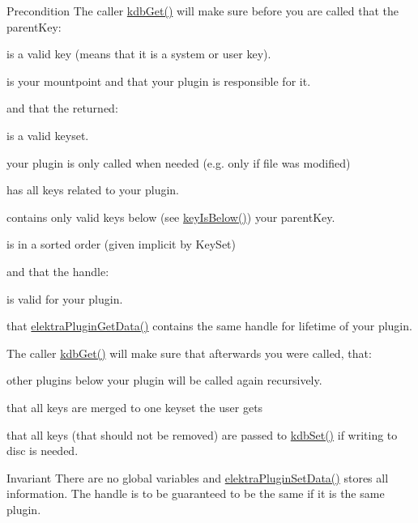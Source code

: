 \begin{DoxyPrecond}{Precondition}
The caller \hyperlink{group__kdb_ga28e385fd9cb7ccfe0b2f1ed2f62453a1}{kdb\+Get()} will make sure before you are called that the parent\+Key\+:
\begin{DoxyItemize}
\item is a valid key (means that it is a system or user key).
\item is your mountpoint and that your plugin is responsible for it. 
\end{DoxyItemize}

and that the returned\+:
\begin{DoxyItemize}
\item is a valid keyset.
\item your plugin is only called when needed (e.\+g. only if file was modified)
\item has {\ttfamily all} keys related to your plugin.
\item contains only valid keys below (see \hyperlink{group__keytest_ga03332b5d97c76a4fd2640aca4762b8df}{key\+Is\+Below()}) your parent\+Key.
\item is in a sorted order (given implicit by Key\+Set) 
\end{DoxyItemize}

and that the handle\+:
\begin{DoxyItemize}
\item is valid for your plugin.
\item that \hyperlink{group__plugin_gaafcf3216b46292f222b8cc7828b4dd20}{elektra\+Plugin\+Get\+Data()} contains the same handle for lifetime of your plugin.
\end{DoxyItemize}

The caller \hyperlink{group__kdb_ga28e385fd9cb7ccfe0b2f1ed2f62453a1}{kdb\+Get()} will make sure that afterwards you were called, that\+:
\begin{DoxyItemize}
\item other plugins below your plugin will be called again recursively.
\item that all keys are merged to one keyset the user gets
\item that all keys (that should not be removed) are passed to \hyperlink{group__kdb_ga11436b058408f83d303ca5e996832bcf}{kdb\+Set()} if writing to disc is needed.
\end{DoxyItemize}
\end{DoxyPrecond}
\begin{DoxyInvariant}{Invariant}
There are no global variables and \hyperlink{group__plugin_gaf4b941a52ff55d0ca2a9158d90208ef2}{elektra\+Plugin\+Set\+Data()} stores all information. The handle is to be guaranteed to be the same if it is the same plugin.
\end{DoxyInvariant}
